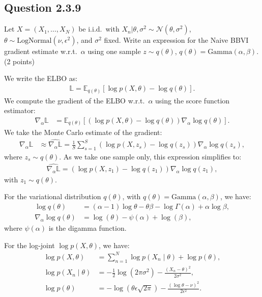 \documentclass{article}
\begin{document}
\begin{multicols}{2}
    \subsection*{Question 2.3.9}
    Let \(X = (X_1, \dots, X_N)\) be i.i.d.\ with \(X_n | \theta, \sigma^2 \sim \mathcal{N}(\theta, \sigma^2)\), \(\theta \sim \text{LogNormal}(\nu, \epsilon^2)\), and \(\sigma^2\) fixed. Write an expression for the Naive BBVI gradient estimate w.r.t.\ \(\alpha\) using one sample \(z \sim q(\theta)\), \(q(\theta) = \text{Gamma}(\alpha, \beta)\). (2 points)\bigskip 

    We write the ELBO as:
    \begin{align*}
        \mathbb{L} = \mathbb{E}_{q(\theta)}\left[\log p(X, \theta) - \log q(\theta)\right].
    \end{align*}
    We compute the gradient of the ELBO w.r.t.\ \(\alpha\) using the score function estimator:
    \begin{align*}
        \nabla_\alpha \mathbb{L} &= \mathbb{E}_{q(\theta)}\left[(\log p(X, \theta) - \log q(\theta)) \nabla_\alpha \log q(\theta) \right].
    \end{align*}
    We take the Monte Carlo estimate of the gradient:
    \begin{align*}
        \nabla_\alpha \mathbb{L} &\approx \widehat{\nabla_\alpha \mathbb{L}} = \frac{1}{S}\sum_{s=1}^{S}(\log p(X, z_s) - \log q(z_s)) \nabla_\alpha \log q(z_s),
    \end{align*}
    where \(z_s \sim q(\theta)\). As we take one sample only, this expression simplifies to:
    \begin{align*}
        \widehat{\nabla_\alpha \mathbb{L}} = (\log p(X, z_1) - \log q(z_1)) \nabla_\alpha \log q(z_1),
    \end{align*}
    with \(z_1 \sim q(\theta)\).

    For the variational distribution \(q(\theta)\), with \(q(\theta) = \text{Gamma}(\alpha, \beta)\), we have:
    \begin{align*}
        \log q(\theta) &= (\alpha - 1)\log \theta - \theta \beta - \log \Gamma(\alpha) + \alpha \log \beta, \\
        \nabla_\alpha \log q(\theta) &= \log(\theta) - \psi(\alpha) + \log(\beta),
    \end{align*}
    where \(\psi(\alpha)\) is the digamma function.

    For the log-joint \(\log p(X, \theta)\), we have:
    \begin{align*}
        \log p(X, \theta) &= \sum_{n=1}^{N} \log p(X_n \mid \theta) + \log p(\theta), \\
        \log p(X_n \mid \theta) &= -\frac{1}{2} \log(2\pi\sigma^2) - \frac{(X_n - \theta)^2}{2\sigma^2}, \\
        \log p(\theta) &= -\log(\theta \epsilon \sqrt{2\pi}) - \frac{(\log \theta - \nu)^2}{2\epsilon^2}.
    \end{align*}


\end{multicols}
\end{document}
